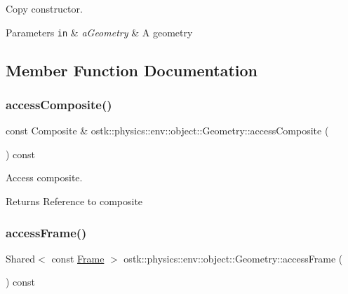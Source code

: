 Copy constructor. 


\begin{DoxyParams}[1]{Parameters}
\mbox{\tt in}  & {\em a\+Geometry} & A geometry \\
\hline
\end{DoxyParams}


\subsection{Member Function Documentation}
\mbox{\label{classostk_1_1physics_1_1env_1_1object_1_1_geometry_a993e5e8bd11e214ad6e3aee10c05cca4}} 
\subsubsection{\texorpdfstring{access\+Composite()}{accessComposite()}}
{\footnotesize\ttfamily const Composite \& ostk\+::physics\+::env\+::object\+::\+Geometry\+::access\+Composite (\begin{DoxyParamCaption}{ }\end{DoxyParamCaption}) const}



Access composite. 

\begin{DoxyReturn}{Returns}
Reference to composite 
\end{DoxyReturn}
\mbox{\label{classostk_1_1physics_1_1env_1_1object_1_1_geometry_a5605bf833c7647eba5c32a88498876cb}} 
\subsubsection{\texorpdfstring{access\+Frame()}{accessFrame()}}
{\footnotesize\ttfamily Shared$<$ const \hyperlink{classostk_1_1physics_1_1coord_1_1_frame}{Frame} $>$ ostk\+::physics\+::env\+::object\+::\+Geometry\+::access\+Frame (\begin{DoxyParamCaption}{ }\end{DoxyParamCaption}) const}



